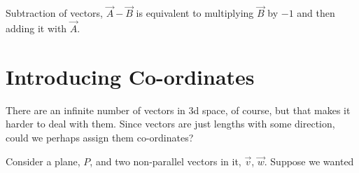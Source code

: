 Subtraction of vectors, \(\vec{A} - \vec{B}\) is equivalent to multiplying \(\vec{B}\) 
by \(-1\) and then adding it with \(\vec{A}\).

\section{Introducing Co-ordinates}

There are an infinite number of vectors in 3d space, of course,
but that makes it harder to deal with them. Since vectors 
are just lengths with some direction, could we perhaps assign them 
co-ordinates? 


Consider a plane, \(P\), and two non-parallel vectors in it,
\(\vec{v}\), \(\vec{w}\). Suppose we wanted 